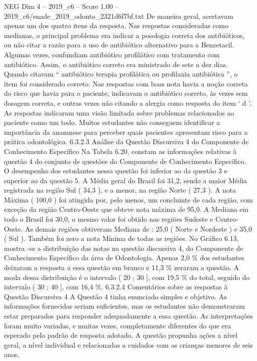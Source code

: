 \begin{textsample}{NEG Dim 4 – 2019\_c6 – Score 1.00 – 2019\_c6/enade\_2019\_odonto\_2321d6f7bf.txt}
De maneira geral, acertavam apenas um dos quatro itens da resposta.
Nas respostas consideradas como medianas, o principal problema era indicar a posologia correta dos antibióticos, ou não citar a razão para a uso de antibiótico alternativo para a Benzetacil.
Algumas vezes, confundiam antibiótico profilático com tratamento com antibiótico.
Assim, o antibiótico correto era ministrado de sete a dez dias.
Quando citavam “ antibiótico terapia profilática ou profilaxia antibiótica ”, o item foi considerado correto.
Nas respostas com boas nota havia a noção correta do risco que havia para o paciente, indicavam o antibiótico correto, às vezes sem dosagem correta, e outras vezes não citando a alergia como resposta do item ‘ d ’.
As respostas indicaram uma visão limitada sobre problemas relacionados ao paciente como um todo.
Muitos estudantes não conseguem identificar a importância da anamnese para perceber quais pacientes apresentam risco para a prática odontológica. 6.3.2.3 Análise da Questão Discursiva 4 do Componente de Conhecimento Específico Na Tabela 6.20, constam as informações relativas à questão 4 do conjunto de questões do Componente de Conhecimento Específico.
O desempenho dos estudantes nessa questão foi inferior ao da questão 3 e superior ao da questão 5.
A Média geral do Brasil foi 31,2, sendo a maior Média registrada na região Sul ( 34,3 ), e a menor, na região Norte ( 27,3 ).
A nota Máxima ( 100,0 ) foi atingida por, pelo menos, um concluinte de cada região, com exceção da região Centro-Oeste que obteve nota máxima de 95,0.
A Mediana em todo o Brasil foi 30,0, o mesmo valor foi obtido nas regiões Sudeste e Centro-Oeste.
As demais regiões obtiveram Mediana de : 25,0 ( Norte e Nordeste ) e 35,0 ( Sul ).
Também foi zero a nota Mínima de todas as regiões.
No Gráfico 6.13, mostra -se a distribuição das notas na questão discursiva 4, do Componente de Conhecimento Específico da área de Odontologia.
Apenas 2,0 \% dos estudantes deixaram a resposta a essa questão em branco e 11,3 \% zeraram a questão.
A moda dessa distribuição é o intervalo ( 20 ; 30 ], com 19,5 \% do total, seguido do intervalo ( 30 ; 40 ], com 16,4 \%. 6.3.2.4 Comentários sobre as respostas à Questão Discursiva 4 A Questão 4 tinha enunciado simples e objetivo.
As informações fornecidas seriam suficientes, mas os estudantes não demonstraram estar preparados para responder adequadamente a essa questão.
As interpretações foram muito variadas, e muitas vezes, completamente diferentes do que era esperado pelo padrão de resposta adotado.
A questão propunha ações a nível geral, a nível individual e relacionadas a cuidados com as crianças menores de seis anos.

\end{textsample}
